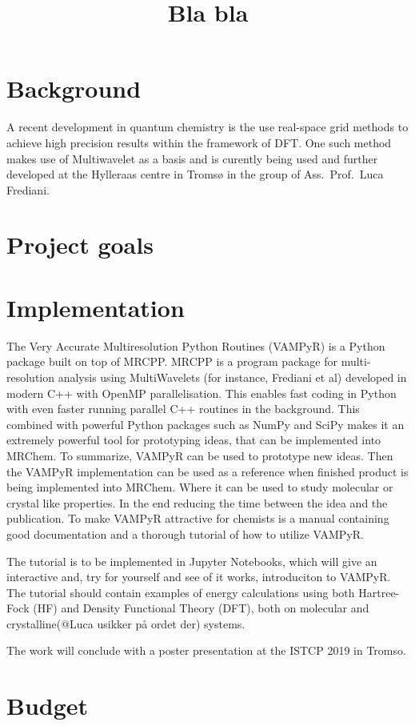 \documentclass[12pt]{article}
\begin{document}
\title{Bla bla}

\maketitle

\section{Background}

A recent development in quantum chemistry is the use real-space grid
methods to achieve high precision results within the framework of
\ac{DFT}. One such method makes use of Multiwavelet as a basis\cite{}
and is curently being used and further developed at the Hylleraas
centre in Tromsø in the group of Ass.~Prof.~Luca Frediani.

\section{Project goals}

\section{Implementation}

The Very Accurate Multiresolution Python Routines (VAMPyR\cite{vampyr})
is a Python package built on top of MRCPP\cite{mrcpp}. MRCPP is a program
package for multi-resolution analysis using MultiWavelets
(for instance, Frediani et al\cite{frediani2013fully})
developed in modern C++ with OpenMP parallelisation.
This enables fast coding in Python with even faster
running parallel C++ routines in the background. This combined with
powerful Python packages such as NumPy\cite{numpy} and SciPy\cite{SciPy}
makes it an extremely powerful tool for prototyping ideas, that can be implemented
into MRChem\cite{mrchem}. To summarize, VAMPyR can be used to prototype
new ideas. Then the VAMPyR implementation can be used as a reference when
finished product is being implemented into MRChem\cite{mrchem}. Where it can
be used to study molecular or crystal like properties. In the end reducing
the time between the idea and the publication. To make VAMPyR attractive
for chemists is a manual containing good documentation and a thorough tutorial
of how to utilize VAMPyR.

The tutorial is to be implemented in Jupyter Notebooks, which will
give an interactive and, try for yourself and see of it works,
introduciton to VAMPyR.
The tutorial should contain examples of energy calculations using
both Hartree-Fock (HF) and Density Functional Theory (DFT), both on
molecular and crystalline(@Luca usikker på ordet der) systems.

The work will conclude with a poster presentation at the ISTCP
2019\cite{istcp} in Tromso.

\section{Budget}





\end{document}
